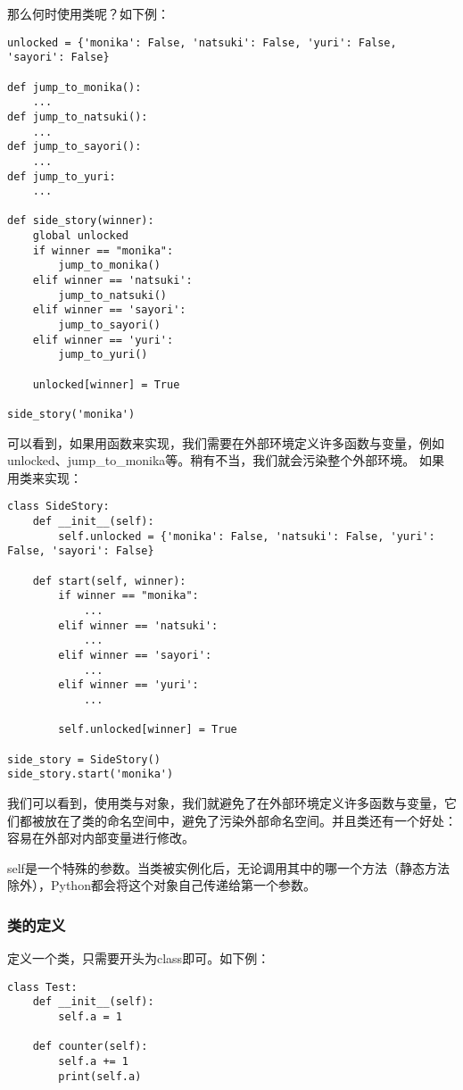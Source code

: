 那么何时使用类呢？如下例：
\begin{lstlisting}
unlocked = {'monika': False, 'natsuki': False, 'yuri': False, 'sayori': False}

def jump_to_monika():
    ...
def jump_to_natsuki():
    ...
def jump_to_sayori():
    ...
def jump_to_yuri:
    ...

def side_story(winner):
    global unlocked
    if winner == "monika":
        jump_to_monika()
    elif winner == 'natsuki':
        jump_to_natsuki()
    elif winner == 'sayori':
        jump_to_sayori()
    elif winner == 'yuri':
        jump_to_yuri()

    unlocked[winner] = True

side_story('monika')

\end{lstlisting}
可以看到，如果用函数来实现，我们需要在外部环境定义许多函数与变量，例如unlocked、jump\_to\_monika等。稍有不当，我们就会污染整个外部环境。
如果用类来实现：
\begin{lstlisting}
class SideStory:
    def __init__(self):
        self.unlocked = {'monika': False, 'natsuki': False, 'yuri': False, 'sayori': False}

    def start(self, winner):
        if winner == "monika":
            ...
        elif winner == 'natsuki':
            ...
        elif winner == 'sayori':
            ...
        elif winner == 'yuri':
            ...
        
        self.unlocked[winner] = True

side_story = SideStory()
side_story.start('monika')
\end{lstlisting}
我们可以看到，使用类与对象，我们就避免了在外部环境定义许多函数与变量，它们都被放在了类的命名空间中，避免了污染外部命名空间。并且类还有一个好处：容易在外部对内部变量进行修改。

\begin{ExtraKnowledge}
    self是一个特殊的参数。当类被实例化后，无论调用其中的哪一个方法（静态方法除外），Python都会将这个对象自己传递给第一个参数。
\end{ExtraKnowledge}

\subsubsection{类的定义}
定义一个类，只需要开头为class即可。如下例：

\begin{lstlisting}
class Test:
    def __init__(self):
        self.a = 1

    def counter(self):
        self.a += 1
        print(self.a)
\end{lstlisting}

